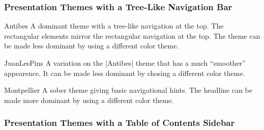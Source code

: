 \subsubsection{Presentation Themes with a Tree-Like Navigation Bar}

\begin{themeexample}{Antibes}
  A dominant theme with a tree-like navigation at the top. The 
  rectangular elements mirror the rectangular navigation at the
  top. The theme can be made less dominant by using a different color
  theme. 
\end{themeexample}

\begin{themeexample}{JuanLesPins}
  A variation on the |Antibes| theme that has a much ``smoother''
  appearence. It can be made less dominant by chosing a different
  color theme.
\end{themeexample}


\begin{themeexample}{Montpellier}
  A sober theme giving basic navigational hints. The headline can be
  made more dominant by using a different color theme.
\end{themeexample}



\subsubsection{Presentation Themes with a Table of Contents Sidebar}

